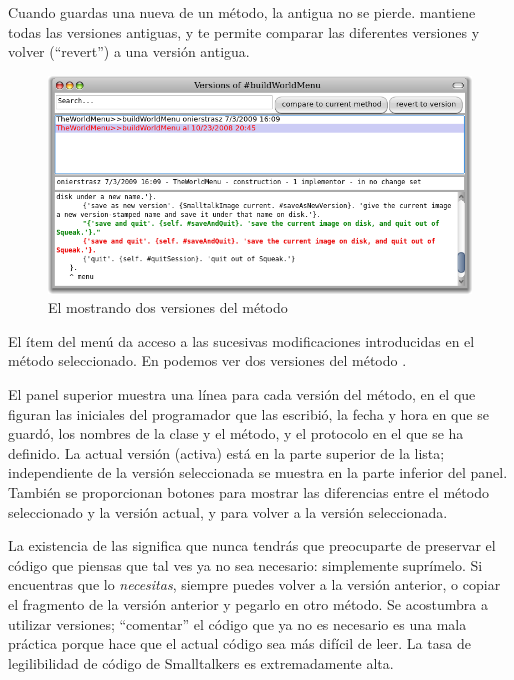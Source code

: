 \documentclass[spanish,a4paper,10pt,twoside]{book}
\begin{document}
Cuando guardas una nueva  de un m\'etodo, la antigua no se pierde.  \pharo mantiene todas las versiones antiguas, y te permite comparar las diferentes versiones y volver (``revert'') a una versi\'on antigua.
\begin{figure}[btp]
   \centering
   \includegraphics[width=\textwidth]{Versions}
   \caption{El  mostrando dos versiones del m\'etodo }
\end{figure}
El \'item del men\'u  da acceso a las sucesivas modificaciones introducidas en el m\'etodo seleccionado.
En  podemos ver dos versiones del m\'etodo .

El panel superior muestra una l\'inea para cada versi\'on del m\'etodo, en el que figuran las iniciales del programador que las escribi\'o, la fecha y hora en que se guard\'o, los nombres de la clase y el m\'etodo, y el protocolo en el que se ha definido.  La actual versi\'on (activa) est\'a en la parte superior de la lista; independiente de la versi\'on seleccionada se muestra en la parte inferior del panel.
Tambi\'en se proporcionan botones para mostrar las diferencias entre el m\'etodo seleccionado y la versi\'on actual, y para volver a la versi\'on seleccionada.

La existencia de las  significa que nunca tendr\'as
que preocuparte de preservar el c\'odigo que piensas que tal ves ya no sea
necesario: simplemente supr\'imelo. Si encuentras que lo \emph{necesitas},
siempre puedes volver a la versi\'on anterior, o copiar el fragmento de la versi\'on anterior y pegarlo en otro m\'etodo. Se acostumbra a utilizar versiones;  ``comentar'' el c\'odigo que ya no es necesario es una mala pr\'actica porque hace que el actual c\'odigo sea m\'as dif\'icil de leer. La tasa de legilibilidad de c\'odigo de Smalltalkers es extremadamente alta.
\end{document}
